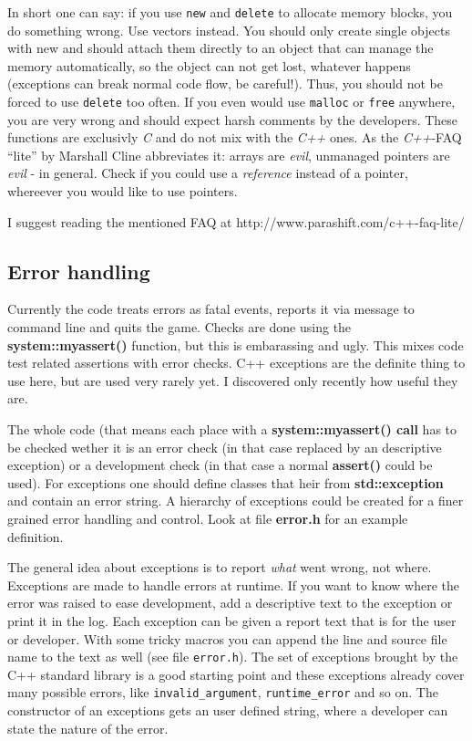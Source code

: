 \documentclass{report}
\begin{document}
In short one can say: if you use \texttt{new} and \texttt{delete} to
allocate memory blocks, you do something wrong. Use vectors instead. You
should only create single objects with new and should attach them
directly to an object that can manage the memory automatically, so the
object can not get lost, whatever happens (exceptions can break normal
code flow, be careful!). Thus, you should not be forced to use
\texttt{delete} too often. If you even would use \texttt{malloc} or
\texttt{free} anywhere, you are very wrong and should expect harsh
comments by the developers. These functions are exclusivly \emph{C} and
do not mix with the \emph{C++} ones. As the \emph{C++}-FAQ ``lite'' by
Marshall Cline abbreviates it: arrays are \emph{evil}, unmanaged
pointers are \emph{evil} - in general. Check if you could use a
\emph{reference} instead of a pointer, whereever you would like to use
pointers.

I suggest reading the mentioned FAQ at
http://www.parashift.com/c++-faq-lite/

\subsection{Error handling}

Currently the code treats errors as fatal events, reports it via message
to command line and quits the game. Checks are done using the
\textbf{system::myassert()} function, but this is embarassing and ugly.
This mixes code test related assertions with error checks.  C++
exceptions are the definite thing to use here, but are used very rarely
yet. I discovered only recently how useful they are.
    
The whole code (that means each place with a \textbf{system::myassert()
  call} has to be checked wether it is an error check (in that case
replaced by an descriptive exception) or a development check (in that
case a normal \textbf{assert()} could be used). For exceptions one
should define classes that heir from \textbf{std::exception} and contain
an error string. A hierarchy of exceptions could be created for a finer
grained error handling and control. Look at file \textbf{error.h} for an
example definition.

The general idea about exceptions is to report \emph{what} went wrong,
not where. Exceptions are made to handle errors at runtime. If you want
to know where the error was raised to ease development, add a
descriptive text to the exception or print it in the log. Each exception
can be given a report text that is for the user or developer. With some
tricky macros you can append the line and source file name to the text
as well (see file \texttt{error.h}). The set of exceptions brought by
the C++ standard library is a good starting point and these exceptions
already cover many possible errors, like \texttt{invalid\_argument},
\texttt{runtime\_error} and so on. The constructor of an exceptions gets
an user defined string, where a developer can state the nature of the
error.
\end{document}
